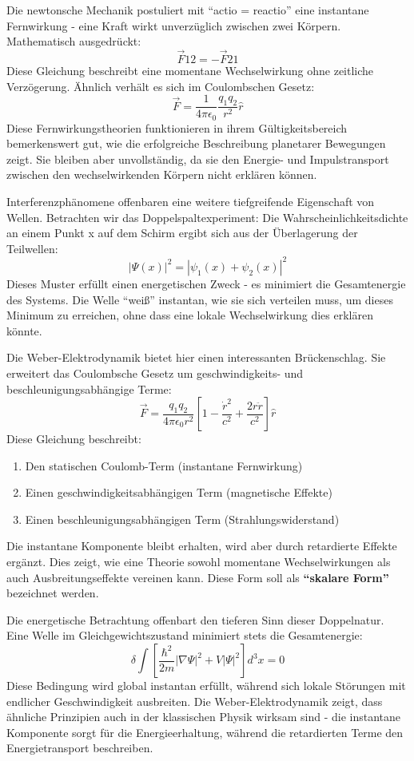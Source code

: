 Die newtonsche Mechanik postuliert mit \enquote{actio = reactio} eine instantane Fernwirkung - eine Kraft wirkt unverzüglich zwischen zwei Körpern. Mathematisch ausgedrückt:
\[
    \vec{F}{12} = -\vec{F}{21}
\]
Diese Gleichung beschreibt eine momentane Wechselwirkung ohne zeitliche Verzögerung. Ähnlich verhält es sich im Coulombschen Gesetz:
\[
    \vec{F} = \frac{1}{4\pi\epsilon_0}\frac{q_1q_2}{r^2}\hat{r}
\]
Diese Fernwirkungstheorien funktionieren in ihrem Gültigkeitsbereich bemerkenswert gut, wie die erfolgreiche Beschreibung planetarer Bewegungen zeigt. Sie bleiben aber unvollständig,
da sie den Energie- und Impulstransport zwischen den wechselwirkenden Körpern nicht erklären können.

Interferenzphänomene offenbaren eine weitere tiefgreifende Eigenschaft von Wellen. Betrachten wir das Doppelspaltexperiment: Die Wahrscheinlichkeitsdichte an einem Punkt x auf dem
Schirm ergibt sich aus der Überlagerung der Teilwellen:
\[
    |\Psi(x)|^2 = |\psi_1(x) + \psi_2(x)|^2
\]
Dieses Muster erfüllt einen energetischen Zweck - es minimiert die Gesamtenergie des Systems. Die Welle \enquote{weiß} instantan, wie sie sich verteilen muss, um dieses Minimum zu erreichen,
ohne dass eine lokale Wechselwirkung dies erklären könnte.

Die Weber-Elektrodynamik bietet hier einen interessanten Brückenschlag. Sie erweitert das Coulombsche Gesetz um geschwindigkeits- und beschleunigungsabhängige Terme:
\begin{equation}
    \label{eq:weber_em_skalar}
    \vec{F} = \frac{q_1q_2}{4\pi\epsilon_0r^2}\left[1 - \frac{\dot{r}^2}{c^2} + \frac{2r\ddot{r}}{c^2}\right]\hat{r}
\end{equation}
Diese Gleichung beschreibt:
\begin{enumerate}
    \item Den statischen Coulomb-Term (instantane Fernwirkung)
    \item Einen geschwindigkeitsabhängigen Term (magnetische Effekte)
    \item Einen beschleunigungsabhängigen Term (Strahlungswiderstand)
\end{enumerate}
Die instantane Komponente bleibt erhalten, wird aber durch retardierte Effekte ergänzt. Dies zeigt, wie eine Theorie sowohl momentane Wechselwirkungen als auch Ausbreitungseffekte vereinen kann.
Diese Form soll als \textbf{\enquote{skalare Form}} bezeichnet werden.

Die energetische Betrachtung offenbart den tieferen Sinn dieser Doppelnatur. Eine Welle im Gleichgewichtszustand minimiert stets die Gesamtenergie:
\[
    \delta \int \left[\frac{\hbar^2}{2m}|\nabla\Psi|^2 + V|\Psi|^2\right] d^3x = 0
\]
Diese Bedingung wird global instantan erfüllt, während sich lokale Störungen mit endlicher Geschwindigkeit ausbreiten. Die Weber-Elektrodynamik zeigt, dass ähnliche Prinzipien auch in der
klassischen Physik wirksam sind - die instantane Komponente sorgt für die Energieerhaltung, während die retardierten Terme den Energietransport beschreiben.

